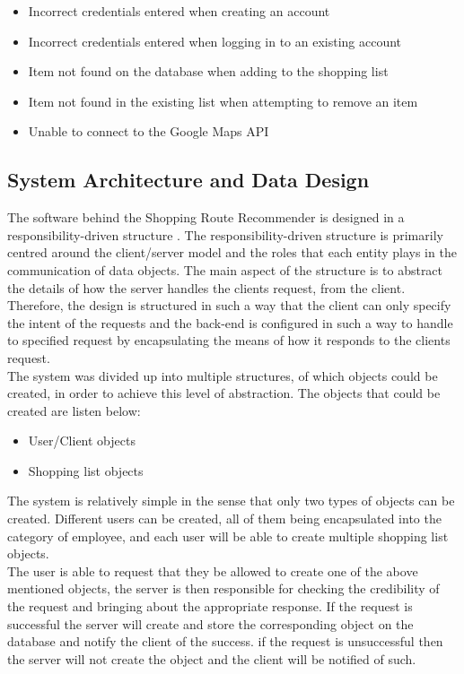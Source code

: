 \documentclass[10pt,twocolumn]{witseiepaper}
\begin{document}
		\begin{itemize}
			\item Incorrect credentials entered when creating an account
			\item Incorrect credentials entered when logging in to an existing account
			\item Item not found on the database when adding to the shopping list
			\item Item not found in the existing list when attempting to remove an item
			\item Unable to connect to the Google Maps API
		\end{itemize}
		
	\subsection{System Architecture and Data Design}
	
		The software behind the Shopping Route Recommender is designed in a responsibility-driven structure \cite{responsibility}. The responsibility-driven structure is primarily centred around the client/server model and the roles that each entity plays in the communication of data objects. The main aspect of the structure is to abstract the details of how the server handles the clients request, from the client. Therefore, the design is structured in such a way that the client can only specify the intent of the requests and the back-end is configured in such a way to handle to specified request by encapsulating the means of how it responds to the clients request.\\
		
		The system was divided up into multiple structures, of which objects could be created, in order to achieve this level of abstraction. The objects that could be created are listen below:
		
		\begin{itemize}
			\item User/Client objects
			\item Shopping list objects
		\end{itemize}
		
		The system is relatively simple in the sense that only two types of objects can be created. Different users can be created, all of them being encapsulated into the category of employee, and each user will be able to create multiple shopping list objects.\\
		
		The user is able to request that they be allowed to create one of the above mentioned objects, the server is then responsible for checking the credibility of the request and bringing about the appropriate response. If the request is successful the server will create and store the corresponding object on the database and notify the client of the success. if the request is unsuccessful then the server will not create the object and the client will be notified of such. \\
		
\end{document}
